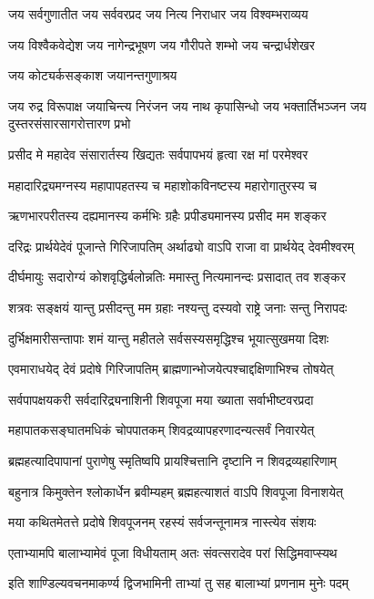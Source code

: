 \begin{center}
\twolineshloka
{जय सर्वगुणातीत जय सर्ववरप्रद}
{जय नित्य निराधार जय विश्वम्भराव्यय} %

\twolineshloka
{जय विश्वैकवेद्येश जय नागेन्द्रभूषण}
{जय गौरीपते शम्भो जय चन्द्रार्धशेखर} %

\onelineshloka
{जय कोट्यर्कसङ्काश जयानन्तगुणाश्रय} %

\threelineshloka
{जय रुद्र विरूपाक्ष जयाचिन्त्य निरंजन}
{जय नाथ कृपासिन्धो जय भक्तार्तिभञ्जन}
{जय दुस्तरसंसारसागरोत्तारण प्रभो} %

\twolineshloka
{प्रसीद मे महादेव संसारार्तस्य खिद्यतः}
{सर्वपापभयं हृत्वा रक्ष मां परमेश्वर} %

\twolineshloka
{महादारिद्र्यमग्नस्य महापापहतस्य च}
{महाशोकविनष्टस्य महारोगातुरस्य च} %

\twolineshloka
{ऋणभारपरीतस्य दह्यमानस्य कर्मभिः}
{ग्रहैः प्रपीड्यमानस्य प्रसीद मम शङ्कर} %

\twolineshloka
{दरिद्रः प्रार्थयेदेवं पूजान्ते गिरिजापतिम्}
{अर्थाढ्यो वाऽपि राजा वा प्रार्थयेद् देवमीश्वरम्} %

\twolineshloka
{दीर्घमायुः सदारोग्यं कोशवृद्धिर्बलोन्नतिः}
{ममास्तु नित्यमानन्दः प्रसादात् तव शङ्कर} %

\twolineshloka
{शत्रवः सङ्क्षयं यान्तु प्रसीदन्तु मम ग्रहाः}
{नश्यन्तु दस्यवो राष्ट्रे जनाः सन्तु निरापदः} %

\twolineshloka
{दुर्भिक्षमारीसन्तापाः शमं यान्तु महीतले}
{सर्वसस्यसमृद्धिश्च भूयात्सुखमया दिशः} %

\twolineshloka
{एवमाराधयेद् देवं प्रदोषे गिरिजापतिम्}
{ब्राह्मणान्भोजयेत्पश्चाद्दक्षिणाभिश्च तोषयेत्} %

\twolineshloka
{सर्वपापक्षयकरी सर्वदारिद्र्यनाशिनी}
{शिवपूजा मया ख्याता सर्वाभीष्टवरप्रदा} %

\twolineshloka
{महापातकसङ्घातमधिकं चोपपातकम्}
{शिवद्रव्यापहरणादन्यत्सर्वं निवारयेत्} %

\twolineshloka
{ब्रह्महत्यादिपापानां पुराणेषु स्मृतिष्वपि}
{प्रायश्चित्तानि दृष्टानि न शिवद्रव्यहारिणाम्} %

\twolineshloka
{बहुनात्र किमुक्तेन श्लोकार्धेन ब्रवीम्यहम्}
{ब्रह्महत्याशतं वाऽपि शिवपूजा विनाशयेत्} %

\twolineshloka
{मया कथितमेतत्ते प्रदोषे शिवपूजनम्}
{रहस्यं सर्वजन्तूनामत्र नास्त्येव संशयः} %

\twolineshloka
{एताभ्यामपि बालाभ्यामेवं पूजा विधीयताम्}
{अतः संवत्सरादेव परां सिद्धिमवाप्स्यथ} %

\twolineshloka
{इति शाण्डिल्यवचनमाकर्ण्य द्विजभामिनी}
{ताभ्यां तु सह बालाभ्यां प्रणनाम मुनेः पदम्} %


\end{center}
